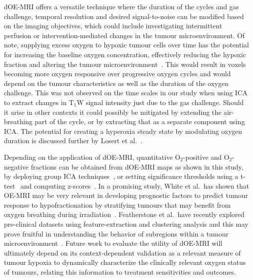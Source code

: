\acs{dOE-MRI} offers a versatile technique where the duration of the cycles and gas challenge, temporal resolution and desired signal-to-noise can be modified based on the imaging objectives, which could include investigating intermittent perfusion or intervention-mediated changes in the tumour microenvironment.
Of note, supplying excess oxygen to hypoxic tumour cells over time has the potential for increasing the baseline oxygen concentration, effectively reducing the hypoxic fraction and altering the tumour microenvironment~\cite{Linnik:2013hf}.
This would result in voxels becoming more oxygen responsive over progressive oxygen cycles and would depend on the tumour characteristics as well as the duration of the oxygen challenge.
This was not observed on the time scales in our study when using \acs{ICA} to extract changes in T$_1$W signal intensity just due to the gas challenge. 
Should it arise in other contexts it could possibly be mitigated by extending the air-breathing part of the cycle, or by extracting that as a separate component using \acs{ICA}.
The potential for creating a hyperoxia steady state by modulating oxygen duration is discussed further by Losert et al.~\cite{Losert:2002gt}.

Depending on the application of \acs{dOE-MRI}, quantitative O$_2$-positive and O$_2$-negative fractions can be obtained from \acs{dOE-MRI} maps as shown in this study, by deploying group \acs{ICA} techniques~\cite{Calhoun:2009jr}, or setting significance thresholds using a t-test~\cite{Greicius:2004ck} and computing z-scores~\cite{McKeown:1998wd}.
In a promising study, White et al.\ has shown that OE-MRI may be very relevant in developing prognostic factors to predict tumour response to hypofractionation by stratifying tumours that may benefit from oxygen breathing during irradiation~\cite{White:2016fz}.
Featherstone et al.\ have recently explored pre-clinical datasets using feature-extraction and clustering analysis and this may prove fruitful in understanding the behavior of subregions within a tumour microenvironment~\cite{Featherstone:2018cn}.
Future work to evaluate the utility of \acs{dOE-MRI} will ultimately depend on its context-dependent validation as a relevant measure of tumour hypoxia to dynamically characterize the clinically relevant oxygen status of tumours, relating this information to treatment sensitivities and outcomes.

